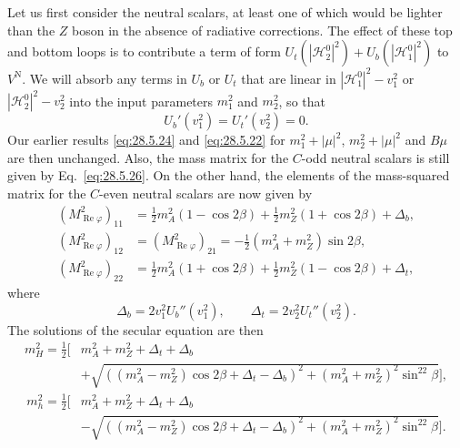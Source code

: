 Let us first consider the neutral scalars, at least one of which would be
lighter than the \(Z\) boson in the absence of radiative corrections. The
effect of these top and bottom loops is to contribute a term of form
\(U_t(|\mathcal{H}_2^0|^2)+U_b(|\mathcal{H}_1^0|^2)\) to \(V^{\mathrm N}\).
We will absorb any terms in \(U_b\) or \(U_t\) that are linear in
\(|\mathcal{H}_1^0|^2-v_1^2\) or \(|\mathcal{H}_2^0|^2-v_2^2\) into the
input parameters \(m_1^2\) and \(m_2^2\), so that
\begin{equation}
  U_b'(v_1^2)=U_t'(v_2^2)=0.
  \tag{28.5.38}\label{eq:28.5.38}
\end{equation}
Our earlier results \eqref{eq:28.5.24} and \eqref{eq:28.5.22} for
\(m_1^2+|\mu|^2\), \(m_2^2+|\mu|^2\) and \(B\mu\) are then unchanged.
Also, the mass matrix for the \(C\)-odd neutral scalars is still given by
Eq.~\eqref{eq:28.5.26}. On the other hand, the elements of the
mass-squared matrix for the \(C\)-even neutral scalars are now given by
\begin{equation}
  \begin{aligned}
  (M_{\operatorname{Re}\varphi}^2)_{11}
  &=\frac12m_A^2(1-\cos2\beta)
    +\frac12m_Z^2(1+\cos2\beta)+\Delta_b,\\
  (M_{\operatorname{Re}\varphi}^2)_{12}
  &=(M_{\operatorname{Re}\varphi}^2)_{21}
    =-\frac12(m_A^2+m_Z^2)\sin2\beta,\\
  (M_{\operatorname{Re}\varphi}^2)_{22}
  &=\frac12m_A^2(1+\cos2\beta)
    +\frac12m_Z^2(1-\cos2\beta)+\Delta_t,
  \end{aligned}
  \tag{28.5.39}\label{eq:28.5.39}
\end{equation}
where
\begin{equation}
  \Delta_b=2v_1^2U_b''(v_1^2),
  \qquad
  \Delta_t=2v_2^2U_t''(v_2^2).
  \tag{28.5.40}\label{eq:28.5.40}
\end{equation}
The solutions of the secular equation are then
\begin{equation}
  \begin{aligned}
  m_H^2=\frac12\biggl[
    &m_A^2+m_Z^2+\Delta_t+\Delta_b\\
    &+\sqrt{
      \left((m_A^2-m_Z^2)\cos2\beta+\Delta_t-\Delta_b\right)^2
      +(m_A^2+m_Z^2)^2\sin^22\beta
    }
  \biggr],
  \end{aligned}
  \tag{28.5.41}\label{eq:28.5.41}
\end{equation}
\begin{equation}
  \begin{aligned}
  m_h^2=\frac12\biggl[
    &m_A^2+m_Z^2+\Delta_t+\Delta_b\\
    &-\sqrt{
      \left((m_A^2-m_Z^2)\cos2\beta+\Delta_t-\Delta_b\right)^2
      +(m_A^2+m_Z^2)^2\sin^22\beta
    }
  \biggr].
  \end{aligned}
  \tag{28.5.42}\label{eq:28.5.42}
\end{equation}
